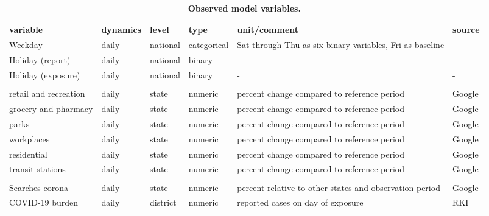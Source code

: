 \documentclass[10pt,letterpaper]{article}
\begin{document}
\begin{table}[!ht]
\begin{adjustwidth}{-2.25in}{0in} %
\centering
\caption{
{\bf Observed model variables.}}
\fontsize{8}{10}\selectfont
\begin{tabular}[t]{llll>{\raggedright\arraybackslash}p{20em}l}
\toprule
variable & dynamics & level & type & unit/comment & source\\
\midrule
Weekday & daily & national & categorical & Sat through Thu as six binary variables, Fri as baseline & -\\
Holiday (report) & daily & national & binary & - & -\\
Holiday (exposure) & daily & national & binary & - & -\\
\addlinespace[0.3em]
\multicolumn{6}{l}{\textbf{Mobility}}\\
\hspace{1em}retail and recreation & daily & state & numeric & percent change compared to reference period & Google \cite{google_mobility}\\
\hspace{1em}grocery and pharmacy & daily & state & numeric & percent change compared to reference period & Google \cite{google_mobility}\\
\hspace{1em}parks & daily & state & numeric & percent change compared to reference period & Google \cite{google_mobility}\\
\hspace{1em}workplaces & daily & state & numeric & percent change compared to reference period & Google \cite{google_mobility}\\
\hspace{1em}residential & daily & state & numeric & percent change compared to reference period & Google \cite{google_mobility}\\
\hspace{1em}transit stations & daily & state & numeric & percent change compared to reference period & Google \cite{google_mobility}\\
\addlinespace[0.3em]
\multicolumn{6}{l}{\textbf{Awareness}}\\
\hspace{1em}Searches corona & daily & state & numeric & percent relative to other states and observation period & Google \cite{google_trends}\\
\hspace{1em}COVID-19 burden & daily & district & numeric & reported cases on day of exposure & RKI \cite{casenumbers_rki}\\

\end{tabular}
\end{adjustwidth}
\end{table}
\end{document}
